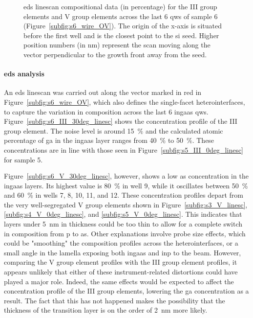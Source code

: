 \begin{figure}
{\begin{tikzpicture}
    \end{tikzpicture}
    }
    \caption[Compositional data resulting from an \acs{eds} linescan across the last 6 \acl{qw} of sample 6.]{\acs{eds} linescan compositional data (in percentage) for the  III group elements and  V group elements 
    across the last \num{6} \acl{qw}s of sample 6 (Figure~\ref{subfig:s6_wire_OV}). The origin of the x-axis is situated before the first well and is the closest point to the \acs{si} seed. Higher position numbers (in nm) represent the scan moving along the  vector perpendicular to the growth front away from the seed.}
    \label{fig:s6_30deg_linescans}
\end{figure}

\paragraph{\acs{eds} analysis} An \acs{eds} linescan was carried out along the  vector marked in red in Figure~\ref{subfig:s6_wire_OV}, which also defines the  single-facet heterointerfaces, to capture the variation in composition across the last \num{6} \acs{ingaas} \acl{qw}s. Figure~\ref{subfig:s6_III_30deg_linesc} shows the concentration profile of the III group element. The noise level is around \qty{15}{\%} and the calculated atomic percentage of \acl{ga} in the \acs{ingaas} layer ranges from \qty{40}{\%} to \qty{50}{\%}. These concentrations are in line with those seen in Figure~\ref{subfig:s5_III_0deg_linesc} for sample 5.

Figure~\ref{subfig:s6_V_30deg_linesc}, however, shows a low \acl{as} concentration in the \acs{ingaas} layers. Its highest value is \qty{80}{\%} in well \num{9}, while it oscillates between \qty{50}{\%} and \qty{60}{\%} in wells \num{7}, \num{8}, \num{10}, \num{11}, and \num{12}. These concentration profiles depart from the very well-segregated V group elements shown in Figure~\ref{subfig:s3_V_linesc}, \ref{subfig:s4_V_0deg_linesc}, and \ref{subfig:s5_V_0deg_linesc}. This indicates that layers under \qty{5}{\nano\metre} in thickness could be too thin to allow for a complete switch in composition from \acl{p} to \acs{as}. Other explanations involve probe size effects, which could be "smoothing" the composition profiles across the heterointerfaces, or a small angle in the lamella exposing both \acs{ingaas} and \acs{inp} to the beam. However, comparing the V group element profiles with the III group element profiles, it appears unlikely that either of these instrument-related distortions could have played a major role. Indeed, the same effects would be expected to affect the concentration profile of the III group elements, lowering the \acl{ga} concentration as a result. The fact that this has not happened makes the possibility that the thickness of the transition layer is on the order of \qty{2}{\nano\metre} more likely. 

